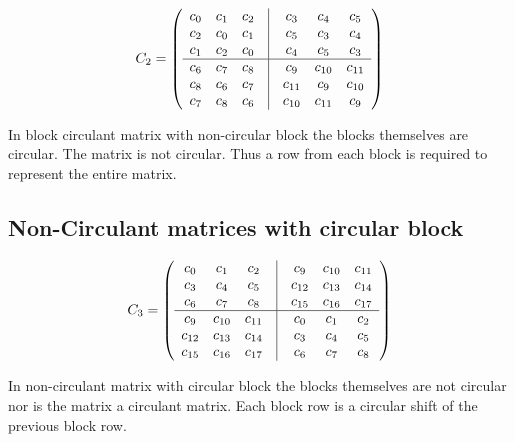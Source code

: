\[ C_{2} =\left( \begin{array}{ccccccc}
c_{0} & c_{1} &c_{2} & \vline & c_{3} & c_{4} &c_{5} \\
c_{2} & c_{0} &c_{1} & \vline & c_{5} & c_{3} &c_{4} \\
c_{1} & c_{2} &c_{0} & \vline & c_{4} & c_{5} &c_{3} \\
\hline
c_{6} & c_{7} &c_{8} & \vline & c_{9} & c_{10} &c_{11} \\
c_{8} & c_{6} &c_{7} & \vline & c_{11} & c_{9} &c_{10} \\
c_{7} & c_{8} &c_{6} & \vline & c_{10} & c_{11} &c_{9} \\
\end{array} \right)\]

In block circulant matrix with non-circular block the blocks  themselves are circular. The matrix is not circular. Thus  a row from
each block is required to represent the entire matrix.

\subsection{Non-Circulant matrices with circular block}
\[ C_{3} =\left( \begin{array}{ccccccc}
c_{0} & c_{1} &c_{2} & \vline & c_{9} & c_{10} &c_{11}   \\
c_{3} & c_{4} &c_{5} & \vline & c_{12} & c_{13} &c_{14}   \\
c_{6} & c_{7} &c_{8} & \vline & c_{15} & c_{16} &c_{17}   \\
\hline
c_{9} & c_{10} &c_{11} & \vline & c_{0} & c_{1} &c_{2}   \\
c_{12} & c_{13} &c_{14} & \vline & c_{3} & c_{4} &c_{5}  \\
c_{15} & c_{16} &c_{17} & \vline & c_{6} & c_{7} &c_{8}   \\
\end{array} \right)\]

In non-circulant matrix with circular block the blocks themselves are not circular nor is the matrix a circulant matrix. 
Each block row is a circular shift of the previous block row.
